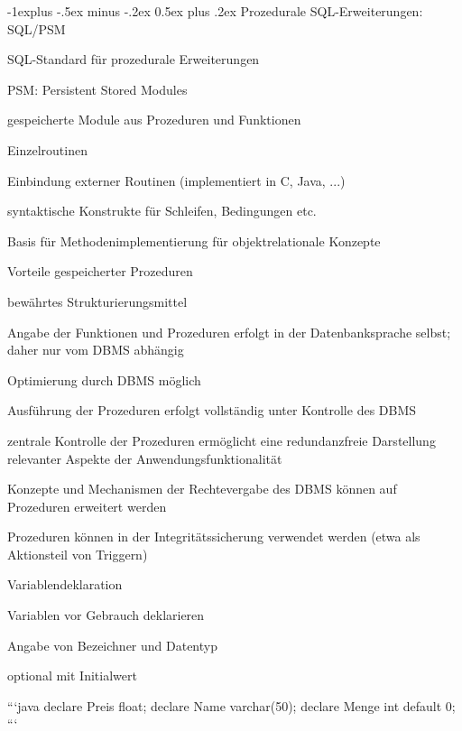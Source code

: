 \documentclass[a4paper]{article}
\makeatletter
\renewcommand{\subsection}{\@startsection{subsection}{2}{0mm}%
                                {-1explus -.5ex minus -.2ex}%
                                {0.5ex plus .2ex}%
                                {\normalfont\normalsize\bfseries}}
\makeatother
\begin{document}
\begin{multicols}{3}
\subsection{Prozedurale SQL-Erweiterungen: SQL/PSM}
\begin{itemize*}
    \item SQL-Standard für prozedurale Erweiterungen
    \item PSM: Persistent Stored Modules
    \begin{itemize*}
        \item gespeicherte Module aus Prozeduren und Funktionen
        \item Einzelroutinen
        \item Einbindung externer Routinen (implementiert in C, Java, ...)
        \item syntaktische Konstrukte für Schleifen, Bedingungen etc.
        \item Basis für Methodenimplementierung für objektrelationale Konzepte
    \end{itemize*}
\end{itemize*}

Vorteile gespeicherter Prozeduren
\begin{itemize*}
    \item bewährtes Strukturierungsmittel
    \item Angabe der Funktionen und Prozeduren erfolgt in der Datenbanksprache selbst; daher nur vom DBMS abhängig
    \item Optimierung durch DBMS möglich
    \item Ausführung der Prozeduren erfolgt vollständig unter Kontrolle des DBMS
    \item zentrale Kontrolle der Prozeduren ermöglicht eine redundanzfreie Darstellung relevanter Aspekte der Anwendungsfunktionalität
    \item Konzepte und Mechanismen der Rechtevergabe des DBMS können auf Prozeduren erweitert werden
    \item Prozeduren können in der Integritätssicherung verwendet werden (etwa als Aktionsteil von Triggern)
\end{itemize*}

Variablendeklaration
\begin{itemize*}
    \item Variablen vor Gebrauch deklarieren
    \item Angabe von Bezeichner und Datentyp
    \item optional mit Initialwert
\end{itemize*}
```java
declare Preis float;
declare Name varchar(50);
declare Menge int default 0;
```


\end{multicols}
\end{document}

